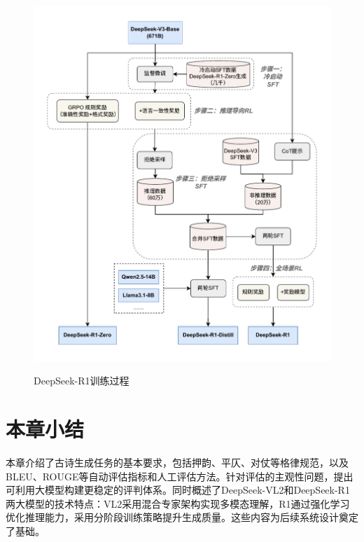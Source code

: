 \begin{figure}[ht]
    \centering
    \includegraphics[width=1\textwidth]
    {figures/deepseek_r1_training_v2.pdf}\\
    \caption{DeepSeek-R1训练过程}
    \label{fig:deepseek_r1_training_v2} %
\end{figure}

\section{本章小结}

本章介绍了古诗生成任务的基本要求，包括押韵、平仄、对仗等格律规范，以及BLEU、ROUGE等自动评估指标和人工评估方法。针对评估的主观性问题，提出可利用大模型构建更稳定的评判体系。同时概述了DeepSeek-VL2和DeepSeek-R1两大模型的技术特点：VL2采用混合专家架构实现多模态理解，R1通过强化学习优化推理能力，采用分阶段训练策略提升生成质量。这些内容为后续系统设计奠定了基础。
